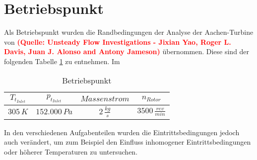 \section{Betriebspunkt}
\label{subsec:aachensetup}
Als Betriebspunkt wurden die Randbedingungen der Analyse der Aachen-Turbine von \textcolor{red}{\textbf{(Quelle: Unsteady Flow Investigations - Jixian Yao, Roger L. Davis, Juan J. Alonso and Antony Jameson)}} übernommen. Diese sind der folgenden Tabelle \ref{tab:aachensetup} zu entnehmen. Im 
\begin{table}[H]
\centering
\label{tab:aachensetup}
\caption{Betriebspunkt}
\begin{tabular}{ c| c| c| c}
$T_{t_{Inlet}}$&$p_{t_{Inlet}}$&$Massenstrom$&$n_{Rotor}$\\
\hline
$305 \, K$&$152.000 \, Pa$&$2 \, \frac{kg}{s}$&$3500 \, \frac{rev}{min}$\\
\end{tabular}
\end{table}
In den verschiedenen Aufgabenteilen wurden die Eintrittsbedingungen jedoch auch verändert, um zum Beispiel den Einfluss inhomogener Eintrittsbedingungen oder höherer Temperaturen zu untersuchen.






